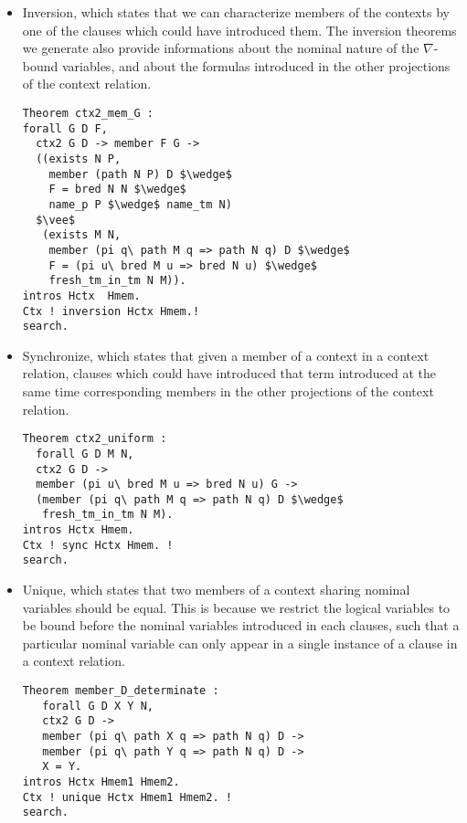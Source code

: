 \documentclass[nocopyrightspace,authoryear]{sigplanconf}
\begin{document}
\begin{comment}
\begin{lstlisting}
command :=
  | "inversion" id id
  | "sync"      id id
  | "unique"    id id id
  | "projas" "(" term ")" id
\end{lstlisting}
\end{comment}

\begin{itemize}
\item Inversion, which states that we can characterize members of the contexts by one of the clauses which could have introduced them. The inversion theorems we generate also provide informations about the nominal nature of the $\nabla$-bound variables, and about the formulas introduced in the other projections of the context relation.

\begin{lstlisting}
Theorem ctx2_mem_G :
forall G D F,
  ctx2 G D -> member F G ->
  ((exists N P, 
    member (path N P) D $\wedge$
    F = bred N N $\wedge$  
    name_p P $\wedge$ name_tm N)
  $\vee$
   (exists M N, 
    member (pi q\ path M q => path N q) D $\wedge$ 
    F = (pi u\ bred M u => bred N u) $\wedge$  
    fresh_tm_in_tm N M)).
intros Hctx  Hmem. 
Ctx ! inversion Hctx Hmem.! 
search.
\end{lstlisting}

\item Synchronize, which states that given a member of a context in a context relation, clauses which could have introduced that term introduced at the same time corresponding members in the other projections of the context relation.
\begin{lstlisting}
Theorem ctx2_uniform :
  forall G D M N,
  ctx2 G D ->
  member (pi u\ bred M u => bred N u) G ->
  (member (pi q\ path M q => path N q) D $\wedge$ 
   fresh_tm_in_tm N M).
intros Hctx Hmem. 
Ctx ! sync Hctx Hmem. ! 
search.
\end{lstlisting}

\item Unique, which states that two members of a context sharing nominal variables should be equal. This is because we restrict the logical variables to be bound before the nominal variables introduced in each clauses, such that a particular nominal variable can only appear in a single instance of a clause in a context relation.   

\begin{lstlisting}
Theorem member_D_determinate :
   forall G D X Y N,
   ctx2 G D ->
   member (pi q\ path X q => path N q) D ->
   member (pi q\ path Y q => path N q) D ->
   X = Y.
intros Hctx Hmem1 Hmem2. 
Ctx ! unique Hctx Hmem1 Hmem2. ! 
search.
\end{lstlisting}


\end{itemize}
\end{document}
